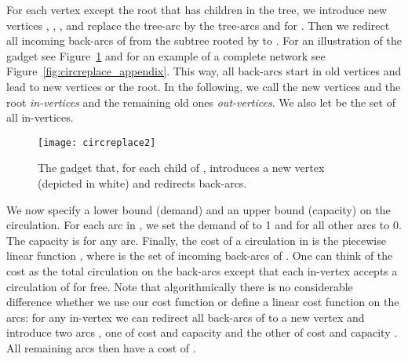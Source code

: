 \documentclass[letterpaper,11pt]{article}
\begin{document}
For each vertex  except the root that has  children  in the tree, we introduce  new vertices ,
, ,  and replace the tree-arc  by the tree-arcs  and  for . 
Then we redirect all incoming back-arcs of  from the subtree rooted
by  to . For an illustration of the gadget see
Figure~\ref{fig:circreplace} and for an example of a complete network
see Figure~\ref{fig:circreplace_appendix}.  This way,
all back-arcs start in old vertices and lead to new vertices or the
root.  In the following, we call the new vertices and the root
\emph{in-vertices} and the remaining old ones \emph{out-vertices}. We
also let  be the set of all in-vertices.

\begin{figure}[bt]
\begin{center}
  \texttt{[image: circreplace2]}
\end{center}
\caption{The gadget that, for each child of , introduces a new vertex (depicted in
  white) and redirects back-arcs.}
\label{fig:circreplace}
\end{figure}


We now specify
a lower bound (demand) and an upper bound (capacity) on the circulation.
For each arc  in , we set the demand of  to 1 and for
all other arcs to
0.
The capacity is  for any arc.  Finally, the cost of a circulation 
in  is the piecewise linear function , where  is the set of incoming back-arcs of
. One can think of the cost as the total circulation on the
back-arcs except that each in-vertex accepts a circulation of  for
free.  Note that algorithmically there is no considerable difference
whether we use our cost function or define a linear cost function on
the arcs: for any in-vertex  we can redirect all back-arcs of 
to a new vertex  and introduce two arcs , one of cost 
and capacity  and the other  of cost  and capacity . All
remaining arcs then have a cost of .
\end{document}
